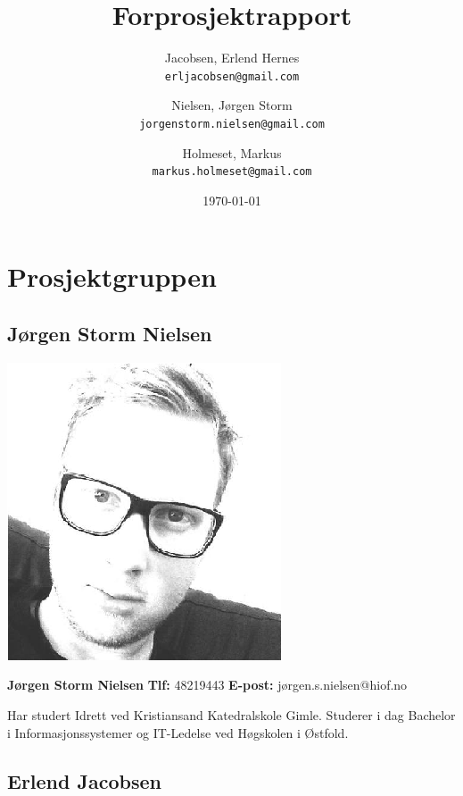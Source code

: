 \documentclass[norsk,a4paper,12pt]{article}
\begin{document}
\author{
	Jacobsen, Erlend Hernes\\
	\texttt{erljacobsen@gmail.com}
	\and
	Nielsen, Jørgen Storm\\
	\texttt{jorgenstorm.nielsen@gmail.com}
	\and
	Holmeset, Markus\\
	\texttt{markus.holmeset@gmail.com}
}
\title{Forprosjektrapport}
\date{\today}
\maketitle

\newpage

\tableofcontents

\newpage

\section{Prosjektgruppen}

\subsection{Jørgen Storm Nielsen}

\includegraphics[scale=0.5]{jorgen.png}

\textbf{Jørgen Storm Nielsen}\newline
\textbf{Tlf:} 48219443\newline
\textbf{E-post:} jørgen.s.nielsen@hiof.no\newline

Har studert Idrett ved Kristiansand Katedralskole Gimle. Studerer i dag Bachelor i Informasjonssystemer og IT-Ledelse ved Høgskolen i Østfold.

\subsection{Erlend Jacobsen}
\end{document}
